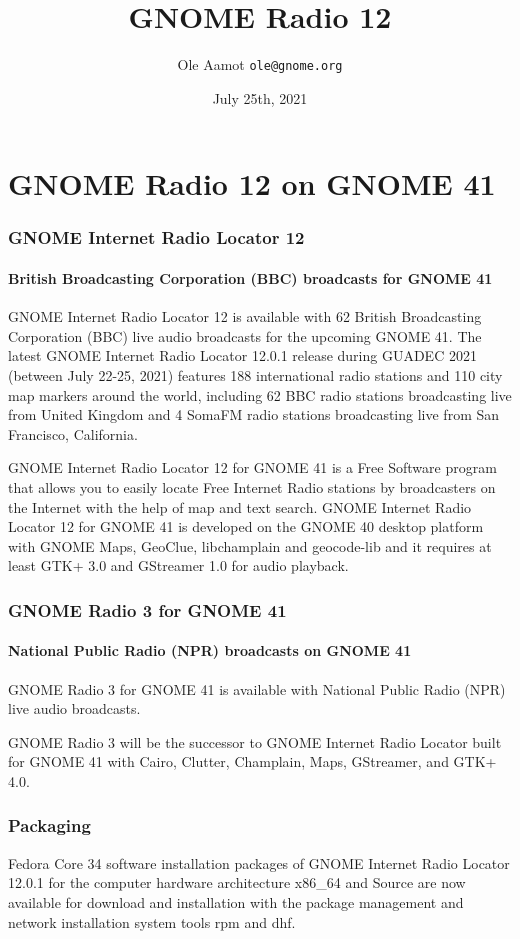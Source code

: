 \documentclass[aspectratio=43]{beamer}
\title[GNOME Radio 12]{GNOME Radio 12}
\author{Ole Aamot \texttt{ole@gnome.org}}
\date{July 25th, 2021}
\begin{document}
\begin{frame}
\titlepage
\end{frame}

\section{GNOME Radio 12 on GNOME 41}

\begin{frame}[containsverbatim]
\frametitle{GNOME Internet Radio Locator 12}
\framesubtitle{British Broadcasting Corporation (BBC) broadcasts for GNOME 41}

GNOME Internet Radio Locator 12 is available with 62 British Broadcasting
Corporation (BBC) live audio broadcasts for the upcoming GNOME 41.  The latest GNOME
Internet Radio Locator 12.0.1 release during GUADEC 2021 (between July
22-25, 2021) features 188 international radio stations and 110 city
map markers around the world, including 62 BBC radio stations
broadcasting live from United Kingdom and 4 SomaFM radio stations
broadcasting live from San Francisco, California.

GNOME Internet Radio Locator 12 for GNOME 41 is a Free Software
program that allows you to easily locate Free Internet Radio stations
by broadcasters on the Internet with the help of map and text search.
GNOME Internet Radio Locator 12 for GNOME 41 is developed on the GNOME
40 desktop platform with GNOME Maps, GeoClue, libchamplain and
geocode-lib and it requires at least GTK+ 3.0 and GStreamer 1.0 for
audio playback.

\end{frame}

\begin{frame}[containsverbatim]
\frametitle{GNOME Radio 3 for GNOME 41}
\framesubtitle{National Public Radio (NPR) broadcasts on GNOME 41}

GNOME Radio 3 for GNOME 41 is available with National Public Radio
(NPR) live audio broadcasts.

GNOME Radio 3 will be the successor to GNOME Internet Radio Locator
built for GNOME 41 with Cairo, Clutter, Champlain, Maps, GStreamer,
and GTK+ 4.0.

\end{frame}

\begin{frame}
\frametitle{Packaging}

Fedora Core 34 software installation packages of GNOME Internet Radio
Locator 12.0.1 for the computer hardware architecture x86\_64 and
Source are now available for download and installation with the
package management and network installation system tools rpm and dhf.

\end{frame}
\end{document}
